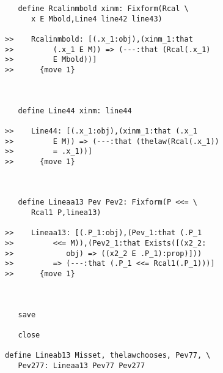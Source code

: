 \documentclass[12pt]{article}
\begin{document}
\begin{verbatim}
   define Rcalinmbold xinm: Fixform(Rcal \
      x E Mbold,Line4 line42 line43)

>>    Rcalinmbold: [(.x_1:obj),(xinm_1:that
>>         (.x_1 E M)) => (---:that (Rcal(.x_1)
>>         E Mbold))]
>>      {move 1}



   define Line44 xinm: line44

>>    Line44: [(.x_1:obj),(xinm_1:that (.x_1
>>         E M)) => (---:that (thelaw(Rcal(.x_1))
>>         = .x_1))]
>>      {move 1}



   define Lineaa13 Pev Pev2: Fixform(P <<= \
      Rcal1 P,linea13)

>>    Lineaa13: [(.P_1:obj),(Pev_1:that (.P_1
>>         <<= M)),(Pev2_1:that Exists([(x2_2:
>>            obj) => ((x2_2 E .P_1):prop)]))
>>         => (---:that (.P_1 <<= Rcal1(.P_1)))]
>>      {move 1}



   save

   close

define Lineab13 Misset, thelawchooses, Pev77, \
   Pev277: Lineaa13 Pev77 Pev277


\end{verbatim}
\end{document}
